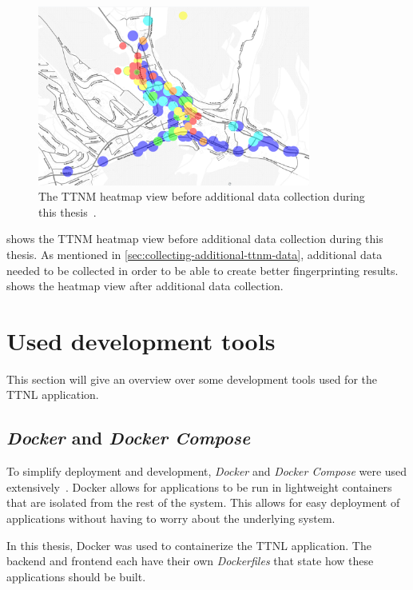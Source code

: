 \begin{figure}[htbp]
    \centering
    \includegraphics[width=0.8\textwidth]{pictures/ttn-mapper/ttnmapper_heatmap_before.png}
    \caption{
        The \ac{TTNM} heatmap view before additional data collection during this thesis~\cite{ttn_mapper_ttn_2023}.
    }\label{pic:ttnm-before-data-collection}
\end{figure}

 shows the \ac{TTNM} heatmap view before additional data collection during this thesis.
As mentioned in \cref{sec:collecting-additional-ttnm-data}, additional data needed to be collected in order to be able to create better fingerprinting results.
 shows the heatmap view after additional data collection.

\section{Used development tools}

This section will give an overview over some development tools used for the \ac{TTNL} application.

\subsection{\emph{Docker} and \emph{Docker Compose}}

To simplify deployment and development, \emph{Docker} and \emph{Docker Compose} were used extensively~\cite{docker_inc_docker_2022}\cite{docker_inc_docker_2023}.
Docker allows for applications to be run in lightweight containers that are isolated from the rest of the system.
This allows for easy deployment of applications without having to worry about the underlying system.

In this thesis, Docker was used to containerize the \ac{TTNL} application.
The backend and frontend each have their own \emph{Dockerfiles} that state how these applications should be built.

